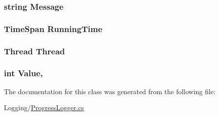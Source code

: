 \subsubsection[{Message}]{\setlength{\rightskip}{0pt plus 5cm}string Message\hspace{0.3cm}{\ttfamily [get]}}\label{classOTA_1_1Logging_1_1ProgressLogger_a40e8debace0cc6f4f7baa0fdd309c103}
\hypertarget{classOTA_1_1Logging_1_1ProgressLogger_abbeaf7ccbf2f397ea4a63c0709b39244}{}
\subsubsection[{Running\+Time}]{\setlength{\rightskip}{0pt plus 5cm}Time\+Span Running\+Time\hspace{0.3cm}{\ttfamily [get]}}\label{classOTA_1_1Logging_1_1ProgressLogger_abbeaf7ccbf2f397ea4a63c0709b39244}
\hypertarget{classOTA_1_1Logging_1_1ProgressLogger_a2f30b4dbbf82ba9ab1c3d2d25414ffd0}{}
\subsubsection[{Thread}]{\setlength{\rightskip}{0pt plus 5cm}Thread Thread\hspace{0.3cm}{\ttfamily [get]}}\label{classOTA_1_1Logging_1_1ProgressLogger_a2f30b4dbbf82ba9ab1c3d2d25414ffd0}
\hypertarget{classOTA_1_1Logging_1_1ProgressLogger_aca5c8bf6cfb5ea8d150d4b2f394fd552}{}
\subsubsection[{Value}]{\setlength{\rightskip}{0pt plus 5cm}int Value\hspace{0.3cm}{\ttfamily [get]}, {\ttfamily [set]}}\label{classOTA_1_1Logging_1_1ProgressLogger_aca5c8bf6cfb5ea8d150d4b2f394fd552}


The documentation for this class was generated from the following file\+:\begin{DoxyCompactItemize}
\item 
Logging/\hyperlink{ProgressLogger_8cs}{Progress\+Logger.\+cs}\end{DoxyCompactItemize}
